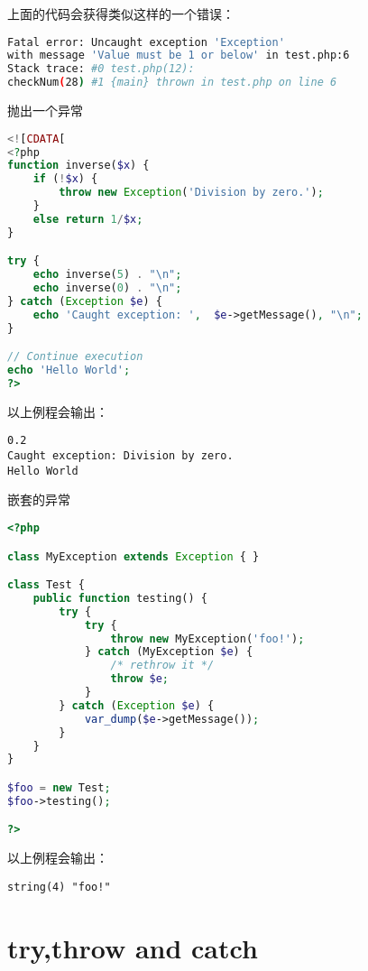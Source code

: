 上面的代码会获得类似这样的一个错误：


\begin{lstlisting}[language=bash]
Fatal error: Uncaught exception 'Exception' 
with message 'Value must be 1 or below' in test.php:6 
Stack trace: #0 test.php(12): 
checkNum(28) #1 {main} thrown in test.php on line 6
\end{lstlisting}






\begin{example}
抛出一个异常
\begin{lstlisting}[language=PHP]
<![CDATA[
<?php
function inverse($x) {
    if (!$x) {
        throw new Exception('Division by zero.');
    }
    else return 1/$x;
}

try {
    echo inverse(5) . "\n";
    echo inverse(0) . "\n";
} catch (Exception $e) {
    echo 'Caught exception: ',  $e->getMessage(), "\n";
}

// Continue execution
echo 'Hello World';
?>
\end{lstlisting}
\end{example}

以上例程会输出：

\begin{verbatim}
0.2
Caught exception: Division by zero.
Hello World
\end{verbatim}

\begin{example}
嵌套的异常
\begin{lstlisting}[language=PHP]
<?php

class MyException extends Exception { }

class Test {
    public function testing() {
        try {
            try {
                throw new MyException('foo!');
            } catch (MyException $e) {
                /* rethrow it */
                throw $e;
            }
        } catch (Exception $e) {
            var_dump($e->getMessage());
        }
    }
}

$foo = new Test;
$foo->testing();

?>
\end{lstlisting}
\end{example}

以上例程会输出：

\begin{verbatim}
string(4) "foo!"
\end{verbatim}

\section{try,throw and catch}

